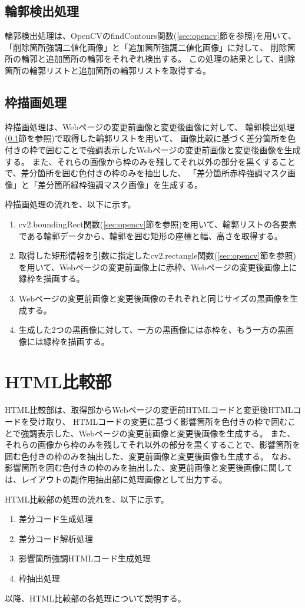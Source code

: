 \subsection{輪郭検出処理}\label{subsec:contour_detection_processing}
輪郭検出処理は、OpenCVのfindContours関数(\ref{sec:opencv}節を参照)を用いて、「削除箇所強調二値化画像」と「追加箇所強調二値化画像」に対して、
削除箇所の輪郭と追加箇所の輪郭をそれぞれ検出する。
この処理の結果として、削除箇所の輪郭リストと追加箇所の輪郭リストを取得する。

\subsection{枠描画処理}\label{subsec:Bounding box drawing process}
枠描画処理は、Webページの変更前画像と変更後画像に対して、
輪郭検出処理(\ref{subsec:contour_detection_processing}節を参照)で取得した輪郭リストを用いて、
画像比較に基づく差分箇所を色付きの枠で囲むことで強調表示したWebページの変更前画像と変更後画像を生成する。
また、それらの画像から枠のみを残してそれ以外の部分を黒くすることで、差分箇所を囲む色付きの枠のみを抽出した、
「差分箇所赤枠強調マスク画像」と「差分箇所緑枠強調マスク画像」を生成する。
\par
枠描画処理の流れを、以下に示す。
\begin{enumerate}
    \item cv2.boundingRect関数(\ref{sec:opencv}節を参照)を用いて、輪郭リストの各要素である輪郭データから、輪郭を囲む矩形の座標と幅、高さを取得する。
    \item 取得した矩形情報を引数に指定したcv2.rectangle関数(\ref{sec:opencv}節を参照)を用いて、Webページの変更前画像上に赤枠、Webページの変更後画像上に緑枠を描画する。
    \item Webページの変更前画像と変更後画像のそれぞれと同じサイズの黒画像を生成する。
    \item 生成した2つの黒画像に対して、一方の黒画像には赤枠を、もう一方の黒画像には緑枠を描画する。
\end{enumerate}

\section{HTML比較部}\label{sec:Affected_area_extraction}
HTML比較部は、取得部からWebページの変更前HTMLコードと変更後HTMLコードを受け取り、
HTMLコードの変更に基づく影響箇所を色付きの枠で囲むことで強調表示した、Webページの変更前画像と変更後画像を生成する。
また、それらの画像から枠のみを残してそれ以外の部分を黒くすることで、影響箇所を囲む色付きの枠のみを抽出した、変更前画像と変更後画像も生成する。
なお、影響箇所を囲む色付きの枠のみを抽出した、変更前画像と変更後画像に関しては、レイアウトの副作用抽出部に処理画像として出力する。
\par
HTML比較部の処理の流れを、以下に示す。
\begin{enumerate}
    \item 差分コード生成処理
    \item 差分コード解析処理
    \item 影響箇所強調HTMLコード生成処理
    \item 枠抽出処理
\end{enumerate}
以降、HTML比較部の各処理について説明する。

